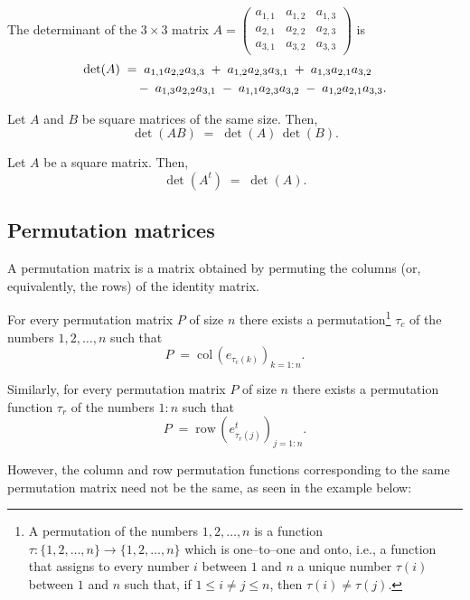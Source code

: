 The determinant of the $3\times3$ matrix $A = \begin{pmatrix} a_{1,1} & a_{1,2} &
a_{1,3} \\ a_{2,1} & a_{2,2} & a_{2,3} \\ a_{3,1} & a_{3,2} & a_{3,3} \end{pmatrix}$ is
\begin{align}
\det(A) \;&=\; a_{1,1}a_{2,2}a_{3,3} \;+\; a_{1,2}a_{2,3}a_{3,1} \;+\; a_{1,3}a_{2,1}a_{3,2} \notag \\
&\quad -\; a_{1,3}a_{2,2}a_{3,1} \;-\; a_{1,1}a_{2,3}a_{3,2} \;-\; a_{1,2}a_{2,1}a_{3,3}.
\end{align}

\begin{lemma}
Let $A$ and $B$ be square matrices of the same size. Then,
\begin{equation}
\det(AB) \;=\; \det(A)\,\det(B).
\end{equation}
\end{lemma}

\begin{lemma}
Let $A$ be a square matrix. Then,
\[
\det(A^t) \;=\; \det(A).
\]
\end{lemma}

\subsection{Permutation matrices}

\begin{definition}
A permutation matrix is a matrix obtained by permuting the columns (or, equivalently,
the rows) of the identity matrix.
\end{definition}

For every permutation matrix $P$ of size $n$ there exists a permutation\footnote{A
permutation of the numbers $1,2,\ldots,n$ is a function $\tau : \{1,2,\ldots,n\} \to
\{1,2,\ldots,n\}$ which is one--to--one and onto, i.e., a function that assigns to every
number $i$ between $1$ and $n$ a unique number $\tau(i)$ between $1$ and $n$ such that,
if $1 \le i \ne j \le n$, then $\tau(i) \ne \tau(j)$.} $\tau_c$ of the numbers $1,2,
\ldots,n$ such that
\[
P \;=\; \mathrm{col}\,\!\left(e_{\tau_c(k)}\right)_{k=1:n}.
\]

Similarly, for every permutation matrix $P$ of size $n$ there exists a permutation
function $\tau_r$ of the numbers $1:n$ such that
\[
P \;=\; \mathrm{row}\,\!\left(e_{\tau_r(j)}^t\right)_{j=1:n}.
\]

However, the column and row permutation functions corresponding to the same
permutation matrix need not be the same, as seen in the example below:

